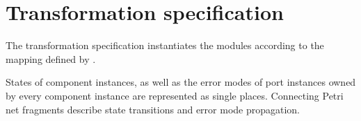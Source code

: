 \section{Transformation specification}

The transformation specification instantiates the  modules according to the mapping defined by \citet[Chapter~6]{Ecsedi16architecture}.

States of component instances, as well as the error modes of port instances owned by every component instance are represented as single places. Connecting Petri net fragments describe state transitions and error mode propagation.

